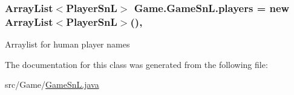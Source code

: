 \subsubsection[{players}]{\setlength{\rightskip}{0pt plus 5cm}Array\+List$<${\bf Player\+Sn\+L}$>$ Game.\+Game\+Sn\+L.\+players = new Array\+List$<${\bf Player\+Sn\+L}$>$()\hspace{0.3cm}{\ttfamily [static]}, {\ttfamily [private]}}\label{class_game_1_1_game_sn_l_a942dda31e02524f87962efa42b2c2642}
Arraylist for human player names 

The documentation for this class was generated from the following file\+:\begin{DoxyCompactItemize}
\item 
src/\+Game/\hyperlink{_game_sn_l_8java}{Game\+Sn\+L.\+java}\end{DoxyCompactItemize}
